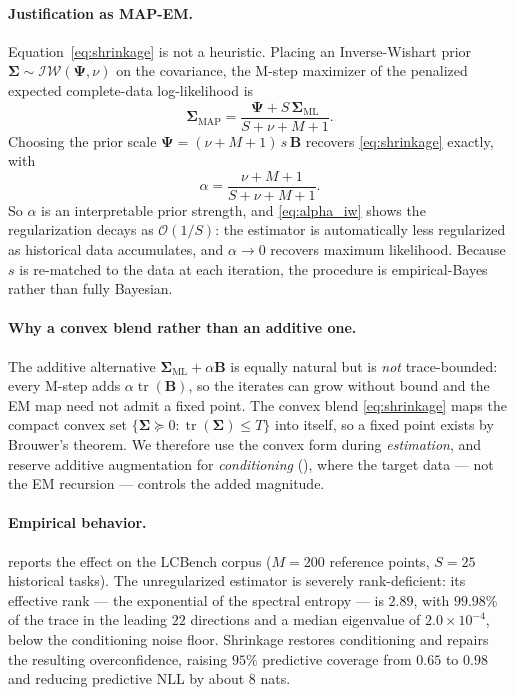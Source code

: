 \documentclass{article}
\newcommand{\K}{S}
\begin{document}
\paragraph{Justification as MAP-EM.}
Equation~\eqref{eq:shrinkage} is not a heuristic. Placing an Inverse-Wishart prior $\boldsymbol{\Sigma}\sim\mathcal{IW}(\boldsymbol{\Psi},\nu)$ on the covariance, the M-step maximizer of the penalized expected complete-data log-likelihood is
\begin{equation}
    \boldsymbol{\Sigma}_{\text{MAP}}
    = \frac{\boldsymbol{\Psi} + \K\,\boldsymbol{\Sigma}_{\text{ML}}}{\K + \nu + M + 1}.
\end{equation}
Choosing the prior scale $\boldsymbol{\Psi} = (\nu + M + 1)\,s\,\mathbf{B}$ recovers \eqref{eq:shrinkage} exactly, with
\begin{equation}
\label{eq:alpha_iw}
    \alpha = \frac{\nu + M + 1}{\K + \nu + M + 1}.
\end{equation}
So $\alpha$ is an interpretable prior strength, and \eqref{eq:alpha_iw} shows the regularization decays as $\mathcal{O}(1/\K)$: the estimator is automatically less regularized as historical data accumulates, and $\alpha\to 0$ recovers maximum likelihood. Because $s$ is re-matched to the data at each iteration, the procedure is empirical-Bayes rather than fully Bayesian.

\paragraph{Why a convex blend rather than an additive one.}
The additive alternative $\boldsymbol{\Sigma}_{\text{ML}} + \alpha\mathbf{B}$ is equally natural but is \emph{not} trace-bounded: every M-step adds $\alpha\operatorname{tr}(\mathbf{B})$, so the iterates can grow without bound and the EM map need not admit a fixed point. The convex blend \eqref{eq:shrinkage} maps the compact convex set $\{\boldsymbol{\Sigma}\succeq 0 : \operatorname{tr}(\boldsymbol{\Sigma})\le T\}$ into itself, so a fixed point exists by Brouwer's theorem. We therefore use the convex form during \emph{estimation}, and reserve additive augmentation for \emph{conditioning} (), where the target data --- not the EM recursion --- controls the added magnitude.

\paragraph{Empirical behavior.}
 reports the effect on the LCBench corpus ($M=200$ reference points, $\K=25$ historical tasks). The unregularized estimator is severely rank-deficient: its effective rank --- the exponential of the spectral entropy --- is $2.89$, with $99.98\%$ of the trace in the leading $22$ directions and a median eigenvalue of $2.0\times10^{-4}$, below the conditioning noise floor. Shrinkage restores conditioning and repairs the resulting overconfidence, raising $95\%$ predictive coverage from $0.65$ to $0.98$ and reducing predictive NLL by about $8$ nats.
\end{document}

